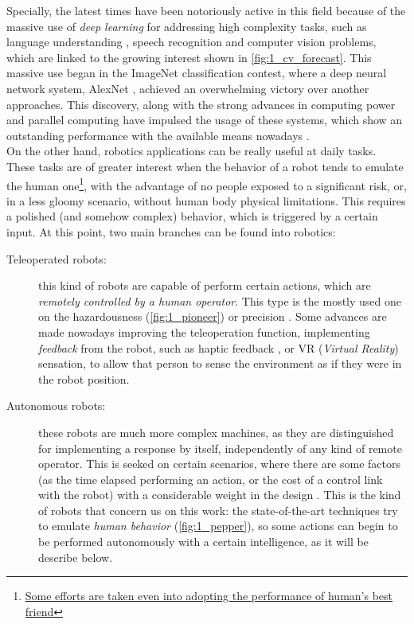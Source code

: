 Specially, the latest times have been notoriously active in this field because of the massive use of \textit{deep learning} for addressing high complexity tasks, such as language understanding \cite{gpt2}, speech recognition \cite{speech_neural} and computer vision problems, which are linked to the growing interest shown in \autoref{fig:1_cv_forecast}. This massive use began in the ImageNet classification contest, where a deep neural network system, AlexNet \cite{alexnet}, achieved an overwhelming victory over another approaches. This discovery, along with the strong advances in computing power and parallel computing have impulsed the usage of these systems, which show an outstanding performance with the available means nowadays \cite{diapos_deep_learning}.\\


On the other hand, robotics applications can be really useful at daily tasks. These tasks are of greater interest when the behavior of a robot tends to emulate the human one\footnote{\href{https://www.engadget.com/2018/01/08/new-sony-aibo-first-impressions/}{Some efforts are taken even into adopting the performance of human's best friend}}, with the advantage of no people exposed to a significant risk, or, in a less gloomy scenario, without human body physical limitations. This requires a polished (and somehow complex) behavior, which is triggered by a certain input. At this point, two main branches can be found into robotics:
\begin{description}
	\item [Teleoperated robots:] this kind of robots are capable of perform certain actions, which are \textit{remotely controlled by a human operator}. This type is the mostly used one on the hazardousness (\autoref{fig:1_pioneer}) \cite{chernobyl-robot} or precision \cite{teleop-surgery}. Some advances are made nowadays improving the teleoperation function, implementing \textit{feedback} from the robot, such as haptic feedback \cite{teleop-haptic}, or VR (\emph{Virtual Reality}) sensation, to allow that person to sense the environment as if they were in the robot position.
	
	\item [Autonomous robots:] these robots are much more complex machines, as they are distinguished for implementing a response by itself, independently of any kind of remote operator. This is seeked on certain scenarios, where there are some factors (as the time elapsed performing an action, or the cost of a control link with the robot) with a considerable weight in the design \cite{ai-space}. This is the kind of robots that concern us on this work: the state-of-the-art techniques try to emulate \textit{human behavior} (\autoref{fig:1_pepper}), so some actions can begin to be performed autonomously with a certain intelligence, as it will be describe below.
\end{description}


